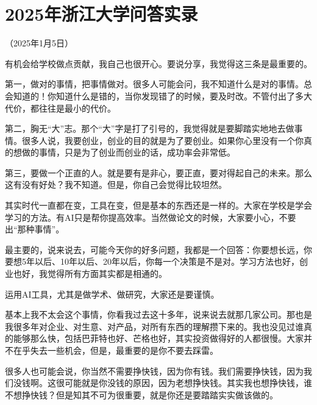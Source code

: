 
\section{2025年浙江大学问答实录}

（2025年1月5日）

有机会给学校做点贡献，我自己也很开心。要说分享，我觉得这三条是最重要的。

第一，做对的事情，把事情做对。很多人可能会问，我不知道什么是对的事情。总会知道的！你知道什么是错的，当你发现错了的时候，要及时改。不管付出了多大代价，都往往是最小的代价。

第二，胸无“大”志。那个“大”字是打了引号的，我觉得就是要脚踏实地地去做事情。很多人说，我要创业，创业的目的就是为了要创业。如果你心里没有一个你真的想做的事情，只是为了创业而创业的话，成功率会非常低。

第三，要做一个正直的人。就是要有是非心，要正直，要对得起自己的未来。那么这有没有好处？我不知道。但是，你自己会觉得比较坦然。



其实时代一直都在变，工具在变，但是基本的东西还是一样的。大家在学校是学会学习的方法。有AI只是帮你提高效率。当然做论文的时候，大家要小心，不要出“那种事情”。

最主要的，说来说去，可能今天你的好多问题，我都是一个回答：你要想长远，你要想5年以后、10年以后、20年以后，你每一个决策是不是对。学习方法也好，创业也好，我觉得所有方面其实都是相通的。


运用AI工具，尤其是做学术、做研究，大家还是要谨慎。



基本上我不太会这个事情，你看我过去这十多年，说来说去就那几家公司。那也是我很多年对企业、对生意、对产品，对所有东西的理解攒下来的。我也没见过谁真的能够那么快，包括巴菲特也好、芒格也好，其实投资做得好的人都很慢。大家并不在乎失去一些机会，但是，最重要的是你不要去踩雷。

很多人也可能会说，你当然不需要挣快钱，因为你有钱。我们需要挣快钱，因为我们没钱啊。这很可能就是你没钱的原因，因为老想挣快钱。其实我也想挣快钱，谁不想挣快钱？但是知其不可为很重要，就是你还是要踏踏实实做该做的。

